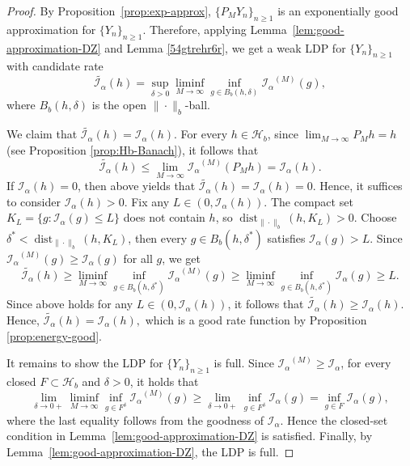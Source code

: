 \documentclass[a4paper, 11pt]{article}
\newcommand{\1}{\mathbf 1}
\theoremstyle{plain}
\begin{document}
\begin{proof}
By Proposition~\ref{prop:exp-approx}, \(\{P_MY_n\}_{n\geq1}\) is an
exponentially good approximation for \(\{Y_n\}_{n\geq1}\). Therefore, applying Lemma~\ref{lem:good-approximation-DZ} and Lemma \ref{54gtrehr6r}, we get a weak LDP for $\{Y_n\}_{n\geq1}$ with candidate rate
\[
  \widetilde{\mathcal{I_{\alpha}}}(h)
  =
  \sup_{\delta>0}\liminf_{M\to\infty}
  \inf_{g\in B_b(h,\delta)}\mathcal{I_{\alpha}}^{(M)}(g),
\]
where \(B_b(h,\delta)\) is the open \(\|\cdot\|_b\)-ball.
\par
We claim that $\widetilde{\mathcal{I_{\alpha}}}(h)=\mathcal{I_{\alpha}}(h).$ For every \(h\in\mathcal{H}_b\), since \(\lim_{M\to\infty}P_Mh=h\) (see Proposition \ref{prop:Hb-Banach}), it follows that
\[
  \widetilde{\mathcal{I_{\alpha}}}(h)
  \leq
  \lim_{M\to\infty}\mathcal{I_{\alpha}}^{(M)}(P_Mh)
  =\mathcal{I_{\alpha}}(h).
\]
If $\mathcal{I_{\alpha}}(h)=0$, then above yields that $\widetilde{\mathcal{I_{\alpha}}}(h)=\mathcal{I_{\alpha}}(h)=0.$ Hence, it suffices to consider $\mathcal{I_{\alpha}}(h)>0$. Fix any \(L\in(0,\mathcal{I_{\alpha}}(h))\). The compact set
\(K_L=\{g:\mathcal{I_{\alpha}}(g)\leq L\}\) does not contain \(h\), so
\(\operatorname{dist}_{\|\cdot\|_b}(h,K_L)>0\).  Choose \(\delta^*<\operatorname{dist}_{\|\cdot\|_b}(h,K_L)\), then every \(g\in B_b(h,\delta^*)\) satisfies
\(\mathcal{I_{\alpha}}(g)>L\).  Since \(\mathcal{I_{\alpha}}^{(M)}(g)\geq\mathcal{I_{\alpha}}(g)\) for all \(g\), we get
\[
  \widetilde{\mathcal{I_{\alpha}}}(h)
  \geq\liminf_{M\to\infty}
  \inf_{g\in B_b(h,\delta^*)}\mathcal{I_{\alpha}}^{(M)}(g) \geq\liminf_{M\to\infty}
  \inf_{g\in B_b(h,\delta^*)}\mathcal{I_{\alpha}}(g)\geq L.
\]
Since above holds for any \(L\in(0,\mathcal{I_{\alpha}}(h))\), it follows that $\widetilde{\mathcal{I_{\alpha}}}(h)\geq\mathcal{I_{\alpha}}(h)$. Hence, $\widetilde{\mathcal{I_{\alpha}}}(h)=\mathcal{I_{\alpha}}(h),$ which is a good rate function by Proposition \ref{prop:energy-good}.
\par
It remains to show the LDP for $\{Y_n\}_{n\geq1}$ is full. Since \(\mathcal{I_{\alpha}}^{(M)}\geq\mathcal{I_{\alpha}}\), for every closed \(F\subset\mathcal{H}_b\) and \(\delta>0\), it holds that
\[
  \lim_{\delta\to0+}\liminf_{M\to\infty}\inf_{g\in F^\delta}\mathcal{I_{\alpha}}^{(M)}(g)
  \geq \lim_{\delta\to0+}\inf_{g\in F^\delta}\mathcal{I_{\alpha}}(g)=\inf_{g\in F}\mathcal{I_{\alpha}}(g),
\]
where the last equality follows from the goodness of \(\mathcal{I_{\alpha}}\).
Hence the closed-set condition in
Lemma~\ref{lem:good-approximation-DZ} is satisfied. Finally, by Lemma~\ref{lem:good-approximation-DZ}, the LDP is full.
\end{proof}
\end{document}

